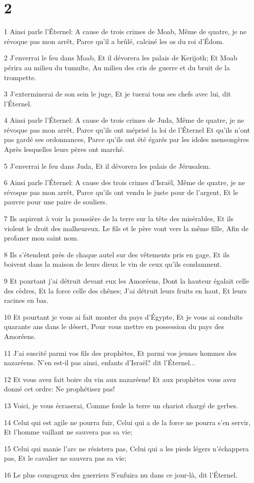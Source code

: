 \chapter{2}

\par 1 Ainsi parle l'Éternel: A cause de trois crimes de Moab, Même de quatre, je ne révoque pas mon arrêt, Parce qu'il a brûlé, calciné les os du roi d'Édom.
\par 2 J'enverrai le feu dans Moab, Et il dévorera les palais de Kerijoth; Et Moab périra au milieu du tumulte, Au milieu des cris de guerre et du bruit de la trompette.
\par 3 J'exterminerai de son sein le juge, Et je tuerai tous ses chefs avec lui, dit l'Éternel.
\par 4 Ainsi parle l'Éternel: A cause de trois crimes de Juda, Même de quatre, je ne révoque pas mon arrêt, Parce qu'ils ont méprisé la loi de l'Éternel Et qu'ils n'ont pas gardé ses ordonnances, Parce qu'ils ont été égarés par les idoles mensongères Après lesquelles leurs pères ont marché.
\par 5 J'enverrai le feu dans Juda, Et il dévorera les palais de Jérusalem.
\par 6 Ainsi parle l'Éternel: A cause des trois crimes d'Israël, Même de quatre, je ne révoque pas mon arrêt, Parce qu'ils ont vendu le juste pour de l'argent, Et le pauvre pour une paire de souliers.
\par 7 Ils aspirent à voir la poussière de la terre sur la tête des misérables, Et ils violent le droit des malheureux. Le fils et le père vont vers la même fille, Afin de profaner mon saint nom.
\par 8 Ils s'étendent près de chaque autel sur des vêtements pris en gage, Et ils boivent dans la maison de leurs dieux le vin de ceux qu'ils condamnent.
\par 9 Et pourtant j'ai détruit devant eux les Amoréens, Dont la hauteur égalait celle des cèdres, Et la force celle des chênes; J'ai détruit leurs fruits en haut, Et leurs racines en bas.
\par 10 Et pourtant je vous ai fait monter du pays d'Égypte, Et je vous ai conduits quarante ans dans le désert, Pour vous mettre en possession du pays des Amoréens.
\par 11 J'ai suscité parmi vos fils des prophètes, Et parmi vos jeunes hommes des nazaréens. N'en est-il pas ainsi, enfants d'Israël? dit l'Éternel...
\par 12 Et vous avez fait boire du vin aux nazaréens! Et aux prophètes vous avez donné cet ordre: Ne prophétisez pas!
\par 13 Voici, je vous écraserai, Comme foule la terre un chariot chargé de gerbes.
\par 14 Celui qui est agile ne pourra fuir, Celui qui a de la force ne pourra s'en servir, Et l'homme vaillant ne sauvera pas sa vie;
\par 15 Celui qui manie l'arc ne résistera pas, Celui qui a les pieds légers n'échappera pas, Et le cavalier ne sauvera pas sa vie;
\par 16 Le plus courageux des guerriers S'enfuira nu dans ce jour-là, dit l'Éternel.

